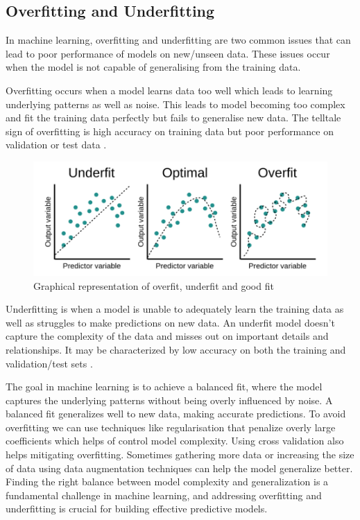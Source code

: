 \subsection{Overfitting and Underfitting}

In machine learning, overfitting and underfitting are two common issues that can lead to poor performance of models on new/unseen data. These issues occur when the model is not capable of generalising from the training data.

Overfitting occurs when a model learns data too well which leads to learning underlying patterns as well as noise. This leads to model becoming too complex and fit the training data perfectly but fails to generalise new data. The telltale sign of overfitting is high accuracy on training data but poor performance on validation or test data \citep{Hawkins2004}.
\begin{figure}[H]
    \centering
    \includegraphics[scale=0.4]{images/fitting.png}
    \caption{Graphical representation of overfit, underfit and good fit \citep{fitting}}
    \label{fig:fitting}
\end{figure}

Underfitting is when a model is unable to adequately learn the training data as well as struggles to make predictions on new data. An underfit model doesn't capture the complexity of the data and misses out on important details and relationships. It may be characterized by low accuracy on both the training and validation/test sets \citep{Hawkins2004}.

The goal in machine learning is to achieve a balanced fit, where the model captures the underlying patterns without being overly influenced by noise. A balanced fit generalizes well to new data, making accurate predictions. To avoid overfitting we can use techniques like regularisation that penalize overly large coefficients which helps of control model complexity. Using cross validation also helps mitigating overfitting. Sometimes gathering more data or increasing the size of data using data augmentation techniques can help the model generalize better. Finding the right balance between model complexity and generalization is a fundamental challenge in machine learning, and addressing overfitting and underfitting is crucial for building effective predictive models.


